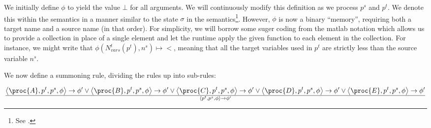 



We initially define $\phi$ to yield the value $\bot$ for all arguments. We will
continuously modify this definition as we process $p^s$ and $p^t$. We denote
this within the semantics in a manner similar to the state $\sigma$ in the
semantics\footnote{See .}. However, $\phi$ is now a
binary ``memory'', requiring both a target name and a source name (in that
order). For simplicity, we will borrow some suger coding from the matlab
notation which allows us to provide a collection in place of a single element
and let the runtime apply the given function to each element in the collection.
For instance, we might write that $\phi\left(N_{vars}^t(p^t), n^s\right)\mapsto
<$, meaning that all the target variables used in $p^t$ are strictly less than
the source variable $n^s$.

We now define a summoning rule, dividing the rules up into sub-rules:

\begin{equation}
{
    \left\langle\proc{A},p^t,p^s,\phi\right\rangle
    \rightarrow
    \phi'
  \vee
    \left\langle\proc{B},p^t,p^s,\phi\right\rangle
    \rightarrow
    \phi'
  \vee
    \left\langle\proc{C},p^t,p^s,\phi\right\rangle
    \rightarrow
    \phi'
  \vee
    \left\langle\proc{D},p^t,p^s,\phi\right\rangle
    \rightarrow
    \phi'
  \vee
    \left\langle\proc{E},p^t,p^s,\phi\right\rangle
    \rightarrow
    \phi'
}\over{
  \left\langle p^t,p^s,\phi\right\rangle
  \rightarrow
  \phi'
}
\end{equation}

